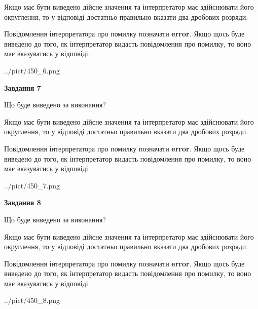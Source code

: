 \documentclass[12pt, ukrainian]{article}
\begin{document}
{\begin {Large}
Якщо має бути виведено дійсне значення та інтерпретатор має здійснювати його округлення, 
то у відповіді достатньо правильно вказати два дробових розряди.

Повідомлення інтерпретатора про помилку позначати \textbf{error}.
Якщо щось буде виведено до того, як інтерпретатор видасть повідомлення про помилку, 
то воно має вказуватись у відповіді. \par

\begin{center}
	{../pict/450_6.png}
\end{center}
\newpage

{\begin {center}\textbf{Завдання 7}\end {center}}\par
Що буде виведено за виконання? \par

Якщо має бути виведено дійсне значення та інтерпретатор має здійснювати його округлення, 
то у відповіді достатньо правильно вказати два дробових розряди.

Повідомлення інтерпретатора про помилку позначати \textbf{error}.
Якщо щось буде виведено до того, як інтерпретатор видасть повідомлення про помилку, 
то воно має вказуватись у відповіді. \par

\begin{center}
	{../pict/450_7.png}
\end{center}
\newpage

{\begin {center}\textbf{Завдання 8}\end {center}}\par
Що буде виведено за виконання? \par

Якщо має бути виведено дійсне значення та інтерпретатор має здійснювати його округлення, 
то у відповіді достатньо правильно вказати два дробових розряди.

Повідомлення інтерпретатора про помилку позначати \textbf{error}.
Якщо щось буде виведено до того, як інтерпретатор видасть повідомлення про помилку, 
то воно має вказуватись у відповіді. \par

\begin{center}
	{../pict/450_8.png}
\end{center}
\newpage


\end{Large}}
\end{document}
